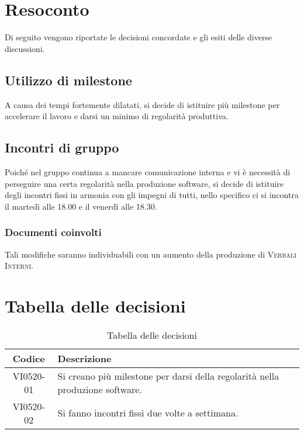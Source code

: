 \documentclass{article}
\begin{document}
\newpage
\section{Resoconto}
\label{sec:resoconto}

Di seguito vengono riportate le decisioni concordate e gli esiti delle diverse discussioni.

\subsection{Utilizzo di milestone}
\label{itm:1}

A causa dei tempi fortemente dilatati, si decide di istituire più milestone per accelerare il lavoro e darsi un minimo di regolarità produttiva.

\subsection{Incontri di gruppo}
\label{itm:2}

Poiché nel gruppo continua a mancare comunicazione interna e vi è necessità di perseguire una certa regolarità nella produzione software, si decide di istituire degli 
incontri fissi in armonia con gli impegni di tutti, nello specifico ci si incontra il martedì alle 18.00 e il venerdì alle 18.30.
\subsubsection*{Documenti coinvolti}
Tali modifiche saranno individuabili con un aumento della produzione di \textsc{Verbali Interni}.


\section{Tabella delle decisioni}%
\label{sub:decisioni}

\begin{table}[!ht]
	\centering
	\begin{tabular}{|c|p{13cm}|}
		\hline
		\rowcolor{lightgray}
		\textbf{Codice} & \textbf{Descrizione} \\ 
		\hline
			VI0520-01 & Si creano più milestone per darsi della regolarità nella produzione software. \\
            VI0520-02 & Si fanno incontri fissi due volte a settimana. \\
		\hline
	\end{tabular}
	\caption{Tabella delle decisioni}
\end{table}
\end{document}
